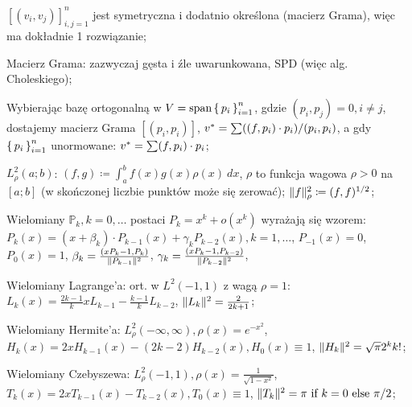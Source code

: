 \entry
$[(v_i, v_j)]^n_{i,j=1}$
jest symetryczna i dodatnio określona (macierz Grama), 
więc ma dokładnie 1 rozwiązanie;

\entry
Macierz Grama: zazwyczaj gęsta i źle uwarunkowana, SPD (więc alg. Choleskiego);

\entry
Wybierając bazę ortogonalną w $V = \text{span}\set{p_i}^n_{i=1}$,
gdzie $(p_i, p_j) = 0, i \neq j$, dostajemy macierz Grama
$[(p_i, p_i)]$, 
$v^{*} = \sum((f,p_i)\cdot p_i)/(p_i, p_i)$,
a gdy $\set{p_i}^n_{i=1}$ unormowane:
$v^{*} = \sum(f,p_i)\cdot p_i$;

\entry
$L^2_\rho(a;b)$:
$(f,g) \coloneqq \int^b_a f(x)g(x)\rho(x) \ dx$,
$\rho$ to funkcja wagowa $\rho > 0$ na $[a;b]$ 
(w skończonej liczbie punktów może się zerować);
$\|f\|^2_\rho \coloneqq (f,f)^{1/2}$;

\entry
Wielomiany $\mathbb{P}_k, k=0,\ldots$ postaci 
$P_k = x^k + o(x^k)$ wyrażają się wzorem:
$P_k(x) = (x + \beta_k) \cdot P_{k-1}(x) + \gamma_k P_{k-2}(x), k=1,\ldots$,
$P_{-1}(x)=0$, 
$P_{0}(x)=1$,
$\beta_k= \frac{(x P_k-1, P_k)}{\|P_{k-1}\|^2}$,
$\gamma_k = \frac{(x P_k-1, P_{k-2})}{\|P_{k-2}\|^2}$,

\entry
Wielomiany Lagrange'a:
ort. w $L^2(-1,1)$ z wagą $\rho = 1$:
$L_k(x) = \frac{2k-1}{k}xL_{k-1} - \frac{k-1}{k}L_{k-2}$,
$\|L_k\|^2=\frac{2}{2k+1}$;

\entry
Wielomiany Hermite'a:
$L^2_\rho(-\infty, \infty), \rho(x)=e^{-x^2}$,
$H_k(x) = 2xH_{k-1}(x) - (2k-2) H_{k-2}(x), H_0(x) \equiv 1$,
$\|H_k\|^2 = \sqrt{\pi}2^kk!$;

\entry
Wielomiany Czebyszewa:
$L_\rho^2(-1,1), \rho(x)=\frac{1}{\sqrt{1-x^2}}$,
$T_k(x) = 2xT_{k-1}(x) - T_{k-2}(x), T_0(x)\equiv 1$,
$\|T_k\|^2 = \pi \text{ if } k=0 \text{ else } \pi/2$;
